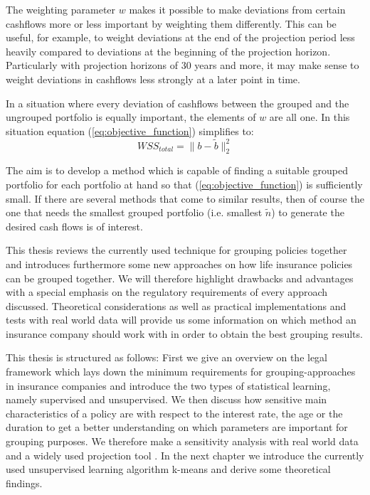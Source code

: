 The weighting parameter $w$ makes it possible to make deviations from certain cashflows more or less important by weighting them differently. This can be useful, for example, to weight deviations at the end of the projection period less heavily compared to deviations at the beginning of the projection horizon. Particularly with projection horizons of 30 years and more, it may make sense to weight deviations in cashflows less strongly at a later point in time. 

\begin{remark}
	In a situation where every deviation of cashflows between the grouped and the ungrouped portfolio is equally important, the elements of $w$ are all one. In this situation equation (\ref{eq:objective_function}) simplifies to:	
	\begin{equation}\label{eq:objective_function_simple}
		WSS_{total} = \lVert b - \tilde{b}\lVert_2^2
	\end{equation}	
\end{remark}

The aim is to develop a method which is capable of finding a suitable grouped portfolio for each portfolio at hand so that (\ref{eq:objective_function}) is sufficiently small. If there are several methods that come to similar results, then of course the one that needs the smallest grouped portfolio (i.e. smallest $\tilde{n}$) to generate the desired cash flows is of interest. 


This thesis reviews the currently used technique for grouping policies together and introduces furthermore some new approaches on how life insurance policies can be grouped together. We will therefore highlight drawbacks and advantages with a special emphasis on the regulatory requirements of every approach discussed. Theoretical considerations as well as practical implementations and tests with real world data will provide us some information on which method an insurance company should work with in order to obtain the best grouping results.  

This thesis is structured as follows: First we give an overview on the legal framework which lays down the minimum requirements for grouping-approaches in insurance companies and introduce the two types of statistical learning, namely supervised and unsupervised. We then discuss how sensitive main characteristics of a policy are with respect to the interest rate, the age or the duration to get a better understanding on which parameters are important for grouping purposes. We therefore make a sensitivity analysis with real world data and a widely used projection tool . In the next chapter we introduce the currently used unsupervised learning algorithm k-means and derive some theoretical findings. 


